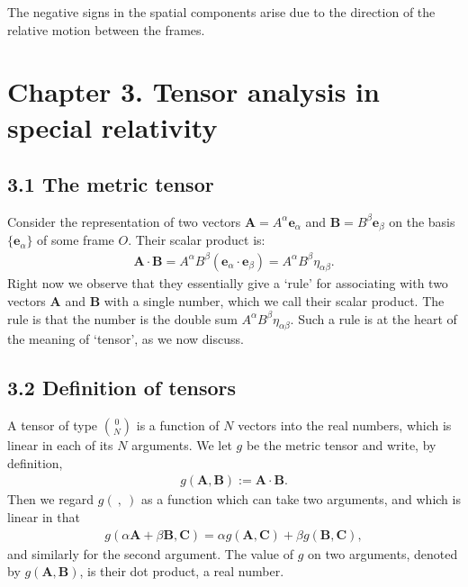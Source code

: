 \documentclass[12pt]{book}
\begin{document}
            The negative signs in the spatial components arise due to the direction of the relative motion between the frames.
           

\section{Chapter 3. Tensor analysis in special relativity}

    \subsection{3.1 The metric tensor}
        Consider the representation of two vectors $\mathbf{A} = A^\alpha \mathbf{e}_\alpha$ and $\mathbf{B} = B^\beta \mathbf{e}_\beta$ on the basis $\{ \mathbf{e}_\alpha \}$ of some frame $O$. Their scalar product is:
        \begin{align}
        \mathbf{A} \cdot \mathbf{B} = A^\alpha B^\beta (\mathbf{e}_\alpha \cdot \mathbf{e}_\beta) = A^\alpha B^\beta \eta_{\alpha\beta}. \tag{3.1}
        \end{align}
        Right now we observe that they essentially give a ‘rule’ for associating with two vectors $\mathbf{A}$ and $\mathbf{B}$ with a single number, which we call their scalar product. The rule is that the number is the double sum $A^\alpha B^\beta \eta_{\alpha\beta}$. Such a rule is at the heart of the meaning of ‘tensor’, as we now discuss.

    \subsection{3.2 Definition of tensors}
        A tensor of type $\binom{0}{N}$ is a function of $N$ vectors into the real numbers, which is linear in each of its $N$ arguments.
        We let $g$ be the metric tensor and write, by definition,
        \begin{align}
        g(\mathbf{A}, \mathbf{B}) := \mathbf{A} \cdot \mathbf{B}. \tag{3.3}
        \end{align}
        Then we regard $g(\ ,\ )$ as a function which can take two arguments, and which is linear in that
        \begin{align}
        g(\alpha \mathbf{A} + \beta \mathbf{B}, \mathbf{C}) = \alpha g(\mathbf{A}, \mathbf{C}) + \beta g(\mathbf{B}, \mathbf{C}), \tag{3.4}
        \end{align}
        and similarly for the second argument. The value of $g$ on two arguments, denoted by $g(\mathbf{A}, \mathbf{B})$, is their dot product, a real number. 
\end{document}
